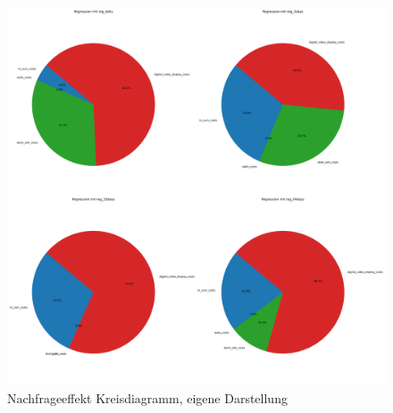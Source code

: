 \begin{figure}[H]
    \centering
    \includegraphics[width=1\linewidth]{images/pie_charts_media_regression.png}
    \caption{Nachfrageeffekt Kreisdiagramm, eigene Darstellung}
    \label{fig:nachfrageeffekteKreisdiagramm}
\end{figure}
\newpage
